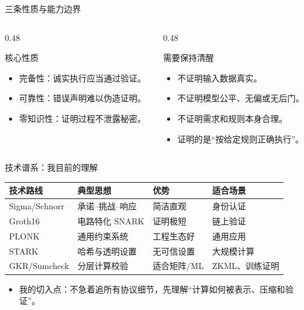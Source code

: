 \documentclass[aspectratio=169]{beamer}
\newcommand{\kw}[1]{\textcolor{uestc}{\heiti #1}}
\begin{document}
\begin{frame}{三条性质与能力边界}
  \begin{columns}[T,onlytextwidth]
    \begin{column}{0.48\textwidth}
      \begin{block}{核心性质}
        \begin{itemize}
          \item \kw{完备性}：诚实执行应当通过验证。
          \item \kw{可靠性}：错误声明难以伪造证明。
          \item \kw{零知识性}：证明过程不泄露秘密。
        \end{itemize}
      \end{block}
    \end{column}
    \begin{column}{0.48\textwidth}
      \begin{block}{需要保持清醒}
        \begin{itemize}
          \item 不证明输入数据真实。
          \item 不证明模型公平、无偏或无后门。
          \item 不证明需求和规则本身合理。
          \item 证明的是“按给定规则正确执行”。
        \end{itemize}
      \end{block}
    \end{column}
  \end{columns}
\end{frame}

\begin{frame}{技术谱系：我目前的理解}
  \begin{table}
    \centering
    \small
    \begin{tabular}{llll}
      \toprule
      技术路线 & 典型思想 & 优势 & 适合场景 \\
      \midrule
      Sigma/Schnorr & 承诺--挑战--响应 & 简洁直观 & 身份认证 \\
      Groth16 & 电路特化 SNARK & 证明极短 & 链上验证 \\
      PLONK & 通用约束系统 & 工程生态好 & 通用应用 \\
      STARK & 哈希与透明设置 & 无可信设置 & 大规模计算 \\
      GKR/Sumcheck & 分层计算校验 & 适合矩阵/ML & ZKML、训练证明 \\
      \bottomrule
    \end{tabular}
  \end{table}
  \vspace{0.3em}
  \begin{itemize}
    \item 我的切入点：不急着追所有协议细节，先理解“计算如何被表示、压缩和验证”。
  \end{itemize}
\end{frame}
\end{document}
